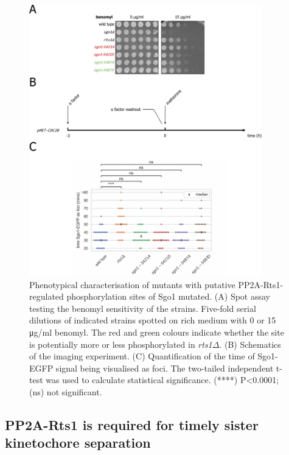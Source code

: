 \begin{figure}[htbp]
  \centering
  \includegraphics[width=0.9\textwidth]{chapter3/figures/sgo1 phospho mutants.pdf}
  \caption[Phenotypical characterisation of mutants with putative PP2A-Rts1-regulated phosphorylation sites of Sgo1 mutated]{Phenotypical characterisation of mutants with putative PP2A-Rts1-regulated phosphorylation sites of Sgo1 mutated. (A) Spot assay testing the benomyl sensitivity of the strains. Five-fold serial dilutions of indicated strains spotted on rich medium with 0 or 15 \si{\micro\gram/\milli\litre} benomyl. The red and green colours indicate whether the site is potentially more or less phosphorylated in \textit{rts1$\Delta$}. (B) Schematics of the imaging experiment. (C) Quantification of the time of Sgo1-EGFP signal being visualised as foci. The two-tailed independent t-test was used to calculate statistical significance. (****) P<0.0001; (ns) not significant. }
  \label{fig:sgo1phosphomutants}
\end{figure}

\subsection{PP2A-Rts1 is required for timely sister kinetochore separation}

